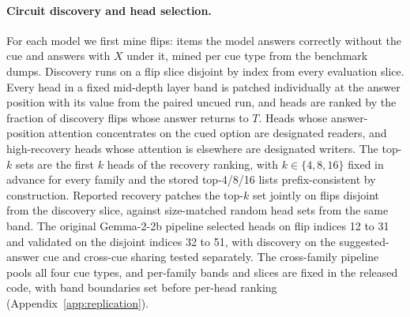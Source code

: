 \documentclass{article}
\begin{document}
\paragraph{Circuit discovery and head selection.} For each model we first mine flips: items the model answers correctly without the cue and answers with $X$ under it, mined per cue type from the benchmark dumps. Discovery runs on a flip slice disjoint by index from every evaluation slice. Every head in a fixed mid-depth layer band is patched individually at the answer position with its value from the paired uncued run, and heads are ranked by the fraction of discovery flips whose answer returns to $T$. Heads whose answer-position attention concentrates on the cued option are designated readers, and high-recovery heads whose attention is elsewhere are designated writers. The top-$k$ sets are the first $k$ heads of the recovery ranking, with $k \in \{4, 8, 16\}$ fixed in advance for every family and the stored top-4/8/16 lists prefix-consistent by construction. Reported recovery patches the top-$k$ set jointly on flips disjoint from the discovery slice, against size-matched random head sets from the same band. The original Gemma-2-2b pipeline selected heads on flip indices 12 to 31 and validated on the disjoint indices 32 to 51, with discovery on the suggested-answer cue and cross-cue sharing tested separately. The cross-family pipeline pools all four cue types, and per-family bands and slices are fixed in the released code, with band boundaries set before per-head ranking (Appendix~\ref{app:replication}).
\end{document}
